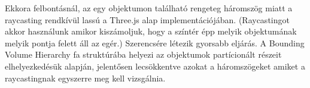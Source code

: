 Ekkora felbontásnál, az egy objektumon található rengeteg háromszög miatt a raycasting \cite{Raycast} rendkívül lassú a Three.js alap implementációjában. (Raycastingot akkor használunk amikor kiszámoljuk, hogy a színtér épp melyik objektumának melyik pontja felett áll az egér.) Szerencsére létezik gyorsabb eljárás. A Bounding Volume Hierarchy \cite{BVH} fa struktúrába helyezi az objektumok partícionált részeit elhelyezkedésük alapján, jelentősen lecsökkentve azokat a háromszögeket amiket a raycastingnak egyszerre meg kell vizsgálnia.

\begin{figure}[h!]
	\centering

	\begin{tikzpicture}[x=0.75pt,y=0.75pt,yscale=-1,xscale=1]


\end{tikzpicture}
\end{figure}
